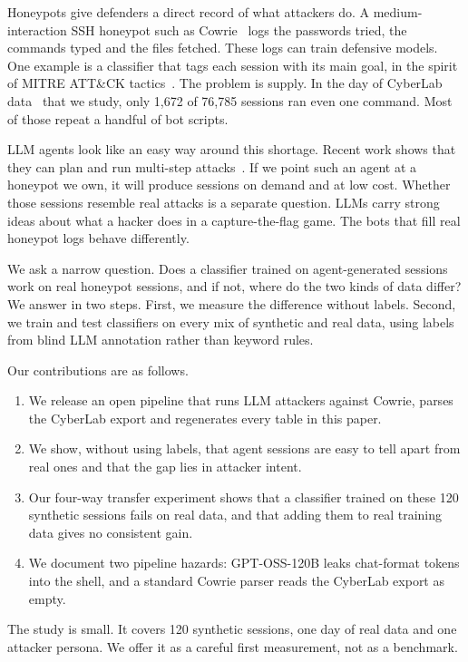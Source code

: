 \documentclass[conference]{IEEEtran}
\begin{document}
Honeypots give defenders a direct record of what attackers do. A medium-interaction SSH honeypot such as Cowrie~\cite{oosterhof2015cowrie} logs the passwords tried, the commands typed and the files fetched. These logs can train defensive models. One example is a classifier that tags each session with its main goal, in the spirit of MITRE ATT\&CK tactics~\cite{strom2018attack}. The problem is supply. In the day of CyberLab data~\cite{sedlar2020cyberlab} that we study, only 1,672 of 76,785 sessions ran even one command. Most of those repeat a handful of bot scripts.

LLM agents look like an easy way around this shortage. Recent work shows that they can plan and run multi-step attacks~\cite{deng2024pentestgpt,fang2024hack}. If we point such an agent at a honeypot we own, it will produce sessions on demand and at low cost. Whether those sessions resemble real attacks is a separate question. LLMs carry strong ideas about what a hacker does in a capture-the-flag game. The bots that fill real honeypot logs behave differently.

We ask a narrow question. Does a classifier trained on agent-generated sessions work on real honeypot sessions, and if not, where do the two kinds of data differ? We answer in two steps. First, we measure the difference without labels. Second, we train and test classifiers on every mix of synthetic and real data, using labels from blind LLM annotation rather than keyword rules.

Our contributions are as follows.
\begin{enumerate}
\item We release an open pipeline that runs LLM attackers against Cowrie, parses the CyberLab export and regenerates every table in this paper.
\item We show, without using labels, that agent sessions are easy to tell apart from real ones and that the gap lies in attacker intent.
\item Our four-way transfer experiment shows that a classifier trained on these 120 synthetic sessions fails on real data, and that adding them to real training data gives no consistent gain.
\item We document two pipeline hazards: GPT-OSS-120B leaks chat-format tokens into the shell, and a standard Cowrie parser reads the CyberLab export as empty.
\end{enumerate}

The study is small. It covers 120 synthetic sessions, one day of real data and one attacker persona. We offer it as a careful first measurement, not as a benchmark.
\end{document}
